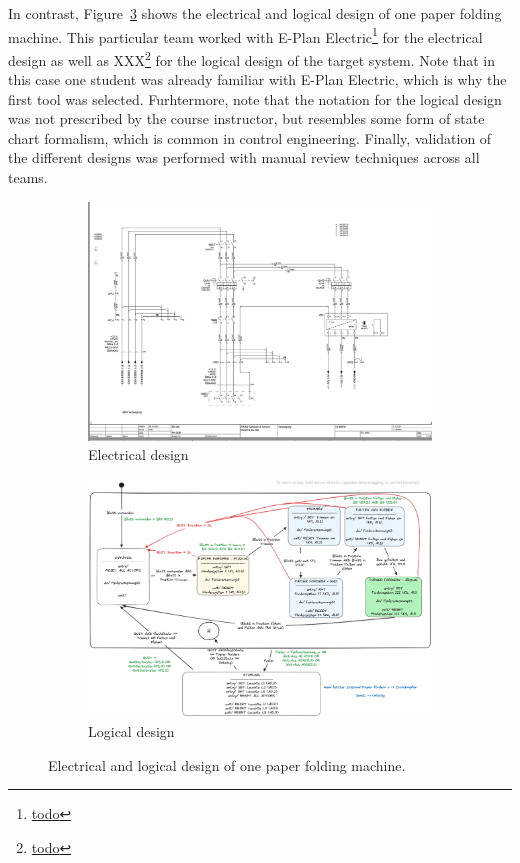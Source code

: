 \documentclass{PDS}
\begin{document}
In contrast, Figure~\ref{fig:paper-sub} shows the electrical and logical design of one paper folding machine.
This particular team worked with E-Plan Electric\footnote{\url{todo}} for the electrical design as well as XXX\footnote{\url{todo}} for the logical design of the target system.
Note that in this case one student was already familiar with E-Plan Electric, which is why the first tool was selected.
Furhtermore, note that the notation for the logical design was not prescribed by the course instructor, but resembles some form of state chart formalism, which is common in control engineering.
Finally, validation of the different designs was performed with manual review techniques across all teams.

\begin{figure}[htbp]
    \begin{subfigure}[b]{0.45\textwidth}
        \includegraphics[width=\textwidth]{./figures/paper_electric.png}
        \caption{Electrical design}
        \label{fig:paper-sub-1}
    \end{subfigure}
    \hfill
    \begin{subfigure}[b]{0.5\textwidth}
        \includegraphics[width=\textwidth]{./figures/paper_control.png}
        \caption{Logical design}
        \label{fig:paper-sub-2}
    \end{subfigure}
    \caption{Electrical and logical design of one paper folding machine.}
    \label{fig:paper-sub}
\end{figure}
\end{document}
